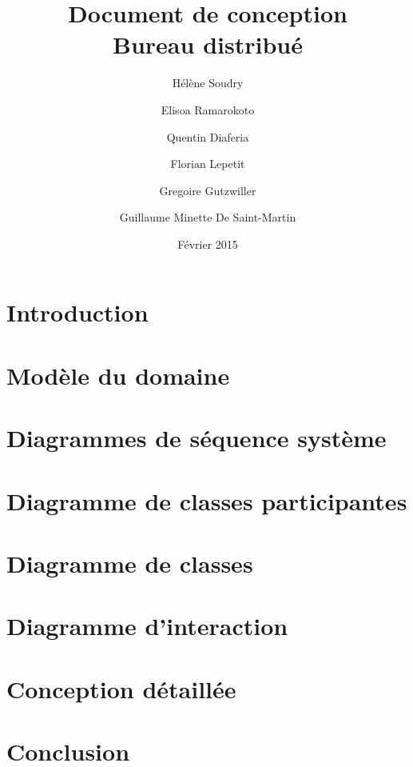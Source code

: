 \documentclass[a4paper, 12pt]{report}
\title{Document de conception \\ Bureau distribué}
\author{Hélène Soudry \and Elisoa Ramarokoto \and Quentin Diaferia \and Florian Lepetit \and Gregoire Gutzwiller \and Guillaume Minette De Saint-Martin}
\date{Février 2015}
\begin{document}
\maketitle
\tableofcontents
\chapter*{Introduction}

\chapter{Modèle du domaine}

\chapter{Diagrammes de séquence système}

\chapter{Diagramme de classes participantes}

\chapter{Diagramme de classes}

\chapter{Diagramme d'interaction}
 
\chapter{Conception détaillée}
 
\chapter*{Conclusion}

\end{document}
